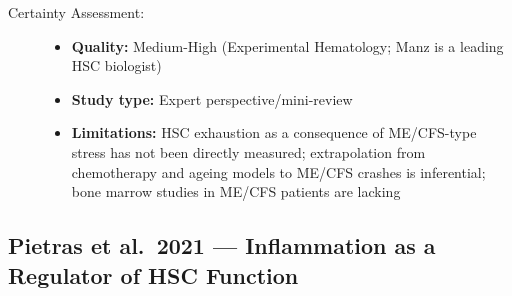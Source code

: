 \begin{description}
    \item[Certainty Assessment:]
    \begin{itemize}
        \item \textbf{Quality:} Medium-High (Experimental Hematology; Manz is a leading HSC biologist)
        \item \textbf{Study type:} Expert perspective/mini-review
        \item \textbf{Limitations:} HSC exhaustion as a consequence of ME/CFS-type stress has not been directly measured; extrapolation from chemotherapy and ageing models to ME/CFS crashes is inferential; bone marrow studies in ME/CFS patients are lacking
    \end{itemize}
\end{description}

\subsection{Pietras et al.\ 2021 --- Inflammation as a Regulator of HSC Function}

